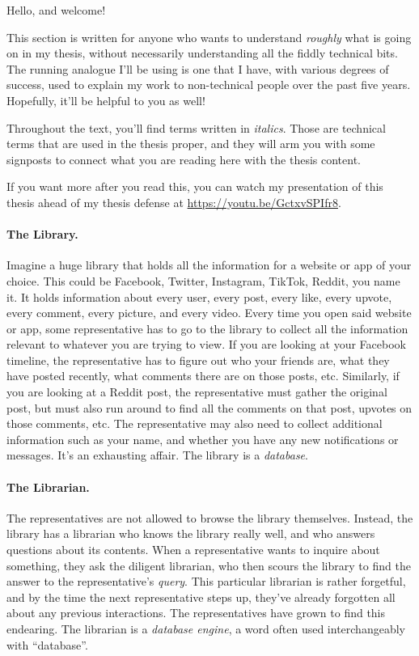Hello, and welcome!

This section is written for anyone who wants to understand \emph{roughly} what
is going on in my thesis, without necessarily understanding all the fiddly
technical bits. The running analogue I'll be using is one that I have, with
various degrees of success, used to explain my work to non-technical people over
the past five years. Hopefully, it'll be helpful to you as well!

Throughout the text, you'll find terms written in \textit{italics}. Those are
technical terms that are used in the thesis proper, and they will arm you with
some signposts to connect what you are reading here with the thesis content.

If you want more after you read this, you can watch my presentation of this
thesis ahead of my thesis defense at \url{https://youtu.be/GctxvSPIfr8}.

\paragraph{The Library.}
%
Imagine a huge library that holds all the information for a website or app of
your choice. This could be Facebook, Twitter, Instagram, TikTok, Reddit, you
name it. It holds information about every user, every post, every like, every
upvote, every comment, every picture, and every video. Every time you open said
website or app, some representative has to go to the library to collect all the
information relevant to whatever you are trying to view. If you are looking at
your Facebook timeline, the representative has to figure out who your friends
are, what they have posted recently, what comments there are on those posts,
etc. Similarly, if you are looking at a Reddit post, the representative must
gather the original post, but must also run around to find all the comments on
that post, upvotes on those comments, etc. The representative may also need to
collect additional information such as your name, and whether you have any new
notifications or messages. It's an exhausting affair. The library is a
\textit{database}.

\paragraph{The Librarian.}
%
The representatives are not allowed to browse the library themselves. Instead,
the library has a librarian who knows the library really well, and who answers
questions about its contents. When a representative wants to inquire about
something, they ask the diligent librarian, who then scours the library to find
the answer to the representative's \textit{query}. This particular librarian is
rather forgetful, and by the time the next representative steps up, they've
already forgotten all about any previous interactions. The representatives have
grown to find this endearing. The librarian is a \textit{database engine}, a
word often used interchangeably with ``database''.

